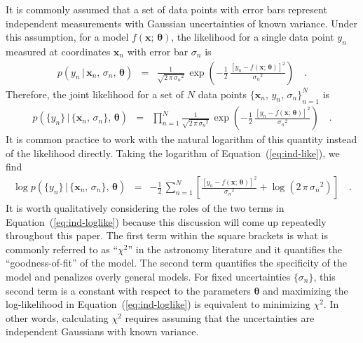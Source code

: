 \documentclass[modern, letterpaper]{aastex61}
\renewcommand{\eqref}[1]{\ref{eq:#1}}
\newcommand{\Eq}[1]{Equation~(\eqref{#1})}
\newcommand{\eq}[1]{\Eq{#1}}
\newcommand{\eqlabel}[1]{\label{eq:#1}}
\newcommand{\bvec}[1]{{\ensuremath{\boldsymbol{#1}}}}
\begin{document}
It is commonly assumed that a set of data points with error bars represent
independent measurements with Gaussian uncertainties of known variance.
Under this assumption, for a model $f(\bvec{x};\,\bvec{\theta})$, the
likelihood for a single data point $y_n$ measured at coordinates $\bvec{x}_n$
with error bar $\sigma_n$ is
\begin{eqnarray}
p(y_n\,|\,\bvec{x}_n,\,\sigma_n,\,\bvec{\theta}) &=&
    \frac{1}{\sqrt{2\,\pi\,{\sigma_n}^2}}\,\exp\left(
    -\frac{1}{2}\,\frac{{[y_n-f(\bvec{x};\,\bvec{\theta})]}^2}{{\sigma_n}^2}
    \right) \quad.
\end{eqnarray}
Therefore, the joint likelihood for a set of $N$ data points ${\{\bvec{x}_n,\,
y_n,\, \sigma_n\}}_{n=1}^N$ is
\begin{eqnarray}\eqlabel{ind-like}
p(\{y_n\}\,|\,\{\bvec{x}_n,\,\sigma_n\},\,\bvec{\theta}) &=&
    \prod_{n=1}^N\frac{1}{\sqrt{2\,\pi\,{\sigma_n}^2}}\,\exp\left(
    -\frac{1}{2}\,\frac{{[y_n-f(\bvec{x};\,\bvec{\theta})]}^2}{{\sigma_n}^2}
    \right) \quad.
\end{eqnarray}
It is common practice to work with the natural logarithm of this quantity
instead of the likelihood directly.
Taking the logarithm of \eq{ind-like}, we find
\begin{eqnarray}\eqlabel{ind-loglike}
\log p(\{y_n\}\,|\,\{\bvec{x}_n,\,\sigma_n\},\,\bvec{\theta}) &=&
    -\frac{1}{2}\,\sum_{n=1}^N\left[
    \frac{{[y_n-f(\bvec{x};\,\bvec{\theta})]}^2}{{\sigma_n}^2}
    +\log {(2\,\pi\,{\sigma_n}^2)}
    \right]\quad.
\end{eqnarray}
It is worth qualitatively considering the roles of the two terms in
\eq{ind-loglike} because this discussion will come up repeatedly throughout
this paper.
The first term within the square brackets is what is commonly referred to as
``$\chi^2$'' in the astronomy literature and it quantifies the
``goodness-of-fit'' of the model.
The second term quantifies the specificity of the model and penalizes overly
general models.
For fixed uncertainties $\{\sigma_n\}$, this second term is a constant with
respect to the parameters $\bvec{\theta}$ and maximizing the log-likelihood in
\eq{ind-loglike} is equivalent to minimizing $\chi^2$.
In other words, calculating $\chi^2$ requires assuming that the uncertainties
are independent Gaussians with known variance.
\end{document}
